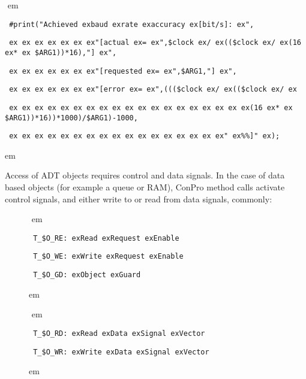 \documentclass[a4paper,12pt,twoside,english]{article}
\def\s{\hskip 1.15 ex}
\begin{document}
\begin{description}
\begin{description}
\def\prefskipu{}\def\prefskipo{}\def\prefskipa{}\def\prefskipu{\hskip10pt}\def\prefskipo{\hskip10pt}\def\prefskipa{\hskip30pt}\def\content{
\vskip-5pt{\parindent0pt\parbox{\linewidth}{\tt\smallsize\hskip10pt \#print("Achieved\s baud\s rate\s accuracy\s {[}bit/s{]}:\s ",}}
\vskip-5pt{\parindent0pt\parbox{\linewidth}{\tt\smallsize\hskip10pt \s \s \s \s \s \s \s "{[}actual\s =\s ",\$clock\s /\s ((\$clock\s /\s (16\s *\s
\$ARG1))*16),"{]}\s ",}}
\vskip-5pt{\parindent0pt\parbox{\linewidth}{\tt\smallsize\hskip10pt \s \s \s \s \s \s \s "{[}requested\s =\s ",\$ARG1,"{]}\s ",}}
\vskip-5pt{\parindent0pt\parbox{\linewidth}{\tt\smallsize\hskip10pt \s \s \s \s \s \s \s "{[}error\s =\s ",(((\$clock\s /\s ((\$clock\s /\s }}
\vskip-5pt{\parindent0pt\parbox{\linewidth}{\tt\smallsize\hskip10pt \s \s \s \s \s \s \s \s \s \s \s \s \s \s \s \s \s \s \s (16\s *\s
\$ARG1))*16))*1000)/\$ARG1)-1000,}}
\vskip-5pt{\parindent0pt\parbox{\linewidth}{\tt\smallsize\hskip10pt \s \s \s \s \s \s \s \s \s \s \s \s \s \s \s \s \s "\s \%\%{]}"\s );}}
}
$ $
 em
\content
{} em

\end{description}
\item[\colorit{\bf Process Access and Scheduler}] $ $\\
Access of ADT objects  requires control and data signals. In the case of data based objects (for example a queue or RAM), ConPro method calls activate control
signals, and either write to or read from data signals, commonly:


\begin{description}
\item[]
\def\prefskipu{}\def\prefskipo{}\def\prefskipa{}\def\prefskipu{\hskip10pt}\def\prefskipo{\hskip10pt}\def\prefskipa{\hskip30pt}\def\content{
\vskip-5pt{\parindent0pt\parbox{\linewidth}{\tt\smallsize\hskip10pt T\_\$O\_RE:\s Read\s Request\s Enable}}
\vskip-5pt{\parindent0pt\parbox{\linewidth}{\tt\smallsize\hskip10pt T\_\$O\_WE:\s Write\s Request\s Enable}}
\vskip-5pt{\parindent0pt\parbox{\linewidth}{\tt\smallsize\hskip10pt T\_\$O\_GD:\s Object\s Guard}}
}
$ $
 em
\content
{} em
\item[]
\def\prefskipu{}\def\prefskipo{}\def\prefskipa{}\def\prefskipu{\hskip10pt}\def\prefskipo{\hskip10pt}\def\prefskipa{\hskip30pt}\def\content{
\vskip-5pt{\parindent0pt\parbox{\linewidth}{\tt\smallsize\hskip10pt T\_\$O\_RD:\s Read\s Data\s Signal\s Vector}}
\vskip-5pt{\parindent0pt\parbox{\linewidth}{\tt\smallsize\hskip10pt T\_\$O\_WR:\s Write\s Data\s Signal\s Vector}}
}
$ $
 em
\content
{} em


\end{description}
\end{description}
\end{document}
